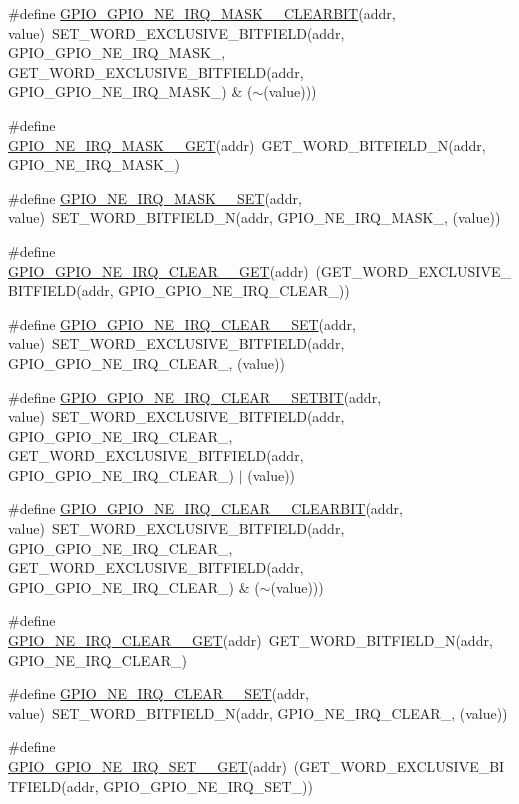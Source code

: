 \begin{DoxyCompactItemize}
\#define \hyperlink{a00554_ac6f311e036307ae9de0da000fd625453}{GPIO\_\-GPIO\_\-NE\_\-IRQ\_\-MASK\_\_\-CLEARBIT}(addr, value)~SET\_\-WORD\_\-EXCLUSIVE\_\-BITFIELD(addr, GPIO\_\-GPIO\_\-NE\_\-IRQ\_\-MASK\_, GET\_\-WORD\_\-EXCLUSIVE\_\-BITFIELD(addr, GPIO\_\-GPIO\_\-NE\_\-IRQ\_\-MASK\_) \& ($\sim$(value)))
\item 
\#define \hyperlink{a00554_a1d189268a1126c6d5425b231bb988fbc}{GPIO\_\-NE\_\-IRQ\_\-MASK\_\_\-GET}(addr)~GET\_\-WORD\_\-BITFIELD\_\-N(addr, GPIO\_\-NE\_\-IRQ\_\-MASK\_)
\item 
\#define \hyperlink{a00554_a6714b4abe91c751740f8adb05e80209e}{GPIO\_\-NE\_\-IRQ\_\-MASK\_\_\-SET}(addr, value)~SET\_\-WORD\_\-BITFIELD\_\-N(addr, GPIO\_\-NE\_\-IRQ\_\-MASK\_, (value))
\item 
\#define \hyperlink{a00554_ad717643b71c5882ae6e1ddb731fa750c}{GPIO\_\-GPIO\_\-NE\_\-IRQ\_\-CLEAR\_\_\-GET}(addr)~(GET\_\-WORD\_\-EXCLUSIVE\_\-BITFIELD(addr, GPIO\_\-GPIO\_\-NE\_\-IRQ\_\-CLEAR\_))
\item 
\#define \hyperlink{a00554_aa5d4ea7d20329dce62a8900a1128f359}{GPIO\_\-GPIO\_\-NE\_\-IRQ\_\-CLEAR\_\_\-SET}(addr, value)~SET\_\-WORD\_\-EXCLUSIVE\_\-BITFIELD(addr, GPIO\_\-GPIO\_\-NE\_\-IRQ\_\-CLEAR\_, (value))
\item 
\#define \hyperlink{a00554_acde44aa15acd88902da1db14ff7150be}{GPIO\_\-GPIO\_\-NE\_\-IRQ\_\-CLEAR\_\_\-SETBIT}(addr, value)~SET\_\-WORD\_\-EXCLUSIVE\_\-BITFIELD(addr, GPIO\_\-GPIO\_\-NE\_\-IRQ\_\-CLEAR\_, GET\_\-WORD\_\-EXCLUSIVE\_\-BITFIELD(addr, GPIO\_\-GPIO\_\-NE\_\-IRQ\_\-CLEAR\_) $|$ (value))
\item 
\#define \hyperlink{a00554_abef539c26649f9daa38cf35c0f84fdbd}{GPIO\_\-GPIO\_\-NE\_\-IRQ\_\-CLEAR\_\_\-CLEARBIT}(addr, value)~SET\_\-WORD\_\-EXCLUSIVE\_\-BITFIELD(addr, GPIO\_\-GPIO\_\-NE\_\-IRQ\_\-CLEAR\_, GET\_\-WORD\_\-EXCLUSIVE\_\-BITFIELD(addr, GPIO\_\-GPIO\_\-NE\_\-IRQ\_\-CLEAR\_) \& ($\sim$(value)))
\item 
\#define \hyperlink{a00554_a7a4110f702b2530edfe72f924f18b856}{GPIO\_\-NE\_\-IRQ\_\-CLEAR\_\_\-GET}(addr)~GET\_\-WORD\_\-BITFIELD\_\-N(addr, GPIO\_\-NE\_\-IRQ\_\-CLEAR\_)
\item 
\#define \hyperlink{a00554_a64561d3e7d56b9762ec9570bf16cc22e}{GPIO\_\-NE\_\-IRQ\_\-CLEAR\_\_\-SET}(addr, value)~SET\_\-WORD\_\-BITFIELD\_\-N(addr, GPIO\_\-NE\_\-IRQ\_\-CLEAR\_, (value))
\item 
\#define \hyperlink{a00554_a99a48d08d23b0112a60b1995862a0548}{GPIO\_\-GPIO\_\-NE\_\-IRQ\_\-SET\_\_\-GET}(addr)~(GET\_\-WORD\_\-EXCLUSIVE\_\-BITFIELD(addr, GPIO\_\-GPIO\_\-NE\_\-IRQ\_\-SET\_))

\end{DoxyCompactItemize}
